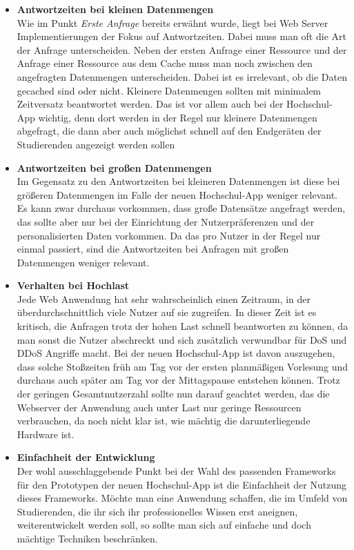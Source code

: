 \begin{itemize}
\item \textbf{Antwortzeiten bei kleinen Datenmengen}\\
Wie im Punkt \textit{Erste Anfrage} bereits erwähnt wurde, liegt bei Web Server Implementierungen der Fokus auf Antwortzeiten. Dabei muss man oft die Art der Anfrage unterscheiden. Neben der ersten Anfrage einer Ressource und der Anfrage einer Ressource aus dem Cache muss man noch zwischen den angefragten Datenmengen unterscheiden. Dabei ist es irrelevant, ob die Daten gecached sind oder nicht. Kleinere Datenmengen sollten mit minimalem Zeitversatz beantwortet werden. Das ist vor allem auch bei der Hochschul-\ac{App} wichtig, denn dort werden in der Regel nur kleinere Datenmengen abgefragt, die dann aber auch möglichst schnell auf den Endgeräten der Studierenden angezeigt werden sollen

\item \textbf{Antwortzeiten bei großen Datenmengen}\\
Im Gegensatz zu den Antwortzeiten bei kleineren Datenmengen ist diese bei größeren Datenmengen im Falle der neuen Hochschul-\ac{App} weniger relevant. Es kann zwar durchaus vorkommen, dass große Datensätze angefragt werden, das sollte aber nur bei der Einrichtung der Nutzerpräferenzen und der personalisierten Daten vorkommen. Da das pro Nutzer in der Regel nur einmal passiert, sind die Antwortzeiten bei Anfragen mit großen Datenmengen weniger relevant.

\item \textbf{Verhalten bei Hochlast}\\
Jede Web Anwendung hat sehr wahrscheinlich einen Zeitraum, in der überdurchschnittlich viele Nutzer auf sie zugreifen. In dieser Zeit ist es kritisch, die Anfragen trotz der hohen Last schnell beantworten zu können, da man sonst die Nutzer abschreckt und sich zusätzlich verwundbar für \ac{DoS} und \ac{DDoS} Angriffe macht. Bei der neuen Hochschul-\ac{App} ist davon auszugehen, dass solche Stoßzeiten früh am Tag vor der ersten planmäßigen Vorlesung und durchaus auch später am Tag vor der Mittagspause entstehen können. Trotz der geringen Gesamtnutzerzahl sollte nun darauf geachtet werden, das die Webserver der Anwendung auch unter Last nur geringe Ressourcen verbrauchen, da noch nicht klar ist, wie mächtig die darunterliegende Hardware ist.

\item \textbf{Einfachheit der Entwicklung}\\
Der wohl ausschlaggebende Punkt bei der Wahl des passenden Frameworks für den Prototypen der neuen Hochschul-\ac{App} ist die Einfachheit der Nutzung dieses Frameworks. Möchte man eine Anwendung schaffen, die im Umfeld von Studierenden, die ihr sich ihr professionelles Wissen erst aneignen, weiterentwickelt werden soll, so sollte man sich auf einfache und doch mächtige Techniken beschränken.

\end{itemize}

